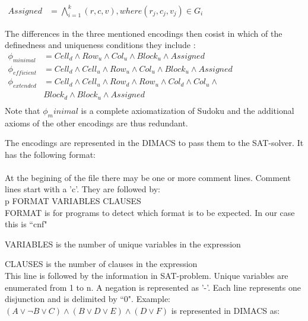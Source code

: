 \documentclass{article}
\begin{document}
$\begin{aligned}
Assigned &= \bigwedge^{k}_{i=1}(r,c,v),  where (r_j,c_j,v_j) \in G_i
\end{aligned}$

The differences in the three mentioned encodings then cosist in which of the definedness and uniqueness conditions they include \cite{optimizedencoding}: \\

$\begin{aligned}
\phi_{minimal} &= Cell_{d} \wedge Row_{u} \wedge Col_{u} \wedge Block_{u} \wedge Assigned &\\
\phi_{efficient} &= Cell_{d} \wedge Cell_{u} \wedge Row_{u} \wedge Col_{u} \wedge Block_{u} \wedge Assigned &\\
\phi_{extended} &= Cell_{d} \wedge Cell_{u} \wedge Row_{d} \wedge Row_{u} \wedge Col_{d} \wedge Col_{u} \wedge &\\
& Block_{d} \wedge Block_{u} \wedge Assigned &\\
\end{aligned}$ \\

Note that $\phi_minimal$ is a complete axiomatization of Sudoku and the additional axioms of the other encodings are thus redundant.

The encodings are represented in the DIMACS to pass them to the SAT-solver. It has the following format:\\\\
At the begining of the file there may be one or more comment lines. Comment lines start with a 'c'. They are followed by: \\

p FORMAT VARIABLES CLAUSES  \\

FORMAT is for programs to detect which format is to be expected. In our case this is ``cnf"

VARIABLES is the number of unique variables in the expression

CLAUSES is the number of clauses in the expression\\

This line is followed by the information in SAT-problem. Unique variables are enumerated from 1 to n. A negation is represented as '-'. Each line represents one disjunction and is delimited by ``0". Example: $(A \vee \neg B \vee C)\wedge(B \vee D \vee E)\wedge(D \vee F)$ is represented in DIMACS as: \\
\end{document}
